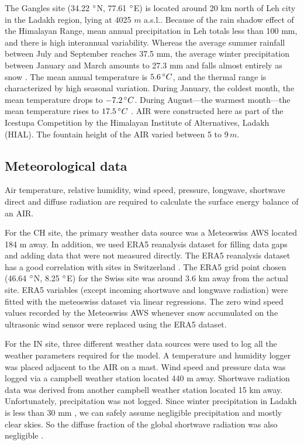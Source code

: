 \documentclass[utf8]{frontiersSCNS} %
\begin{document}
The Gangles site (34.22 $\degree$N, 77.61 $\degree$E) is located around 20 km north of Leh city in the Ladakh region,
lying at 4025 $m$ a.s.l.. Because of the rain shadow effect of the Himalayan Range, mean annual precipitation in Leh
totals less than 100 mm, and there is high interannual variability. Whereas the average summer rainfall between July and
September reaches 37.5 mm, the average winter precipitation between January and March amounts to 27.3 mm and falls
almost entirely as snow . The mean annual temperature is $5.6 \, \degree C$, and the thermal range is characterized by
high seasonal variation. During January, the coldest month, the mean temperature drops to $-7.2 \, \degree C$. During
August—the warmest month—the mean temperature rises to $17.5 \, \degree C$ \citep{Nusser_2012}. AIR were constructed
here as part of the Icestupa Competition  by the Himalayan Institute of Alternatives, Ladakh (HIAL). The fountain height
of the AIR varied between 5 to 9\,$m$. 

\subsection{Meteorological data}

Air temperature, relative humidity, wind speed, pressure, longwave, shortwave direct and diffuse radiation are required
to calculate the surface energy balance of an AIR.

For the CH site, the primary weather data source was a Meteoswiss AWS located 184 m away. In addition, we used ERA5
reanalysis dataset \citep{era5} for filling data gaps and adding data that were not measured directly.  The ERA5
reanalysis dataset has a good correlation with sites in Switzerland \citep{Scherrer_2020}. The ERA5 grid point chosen
(46.64 $\degree$N, 8.25 $\degree$E) for the Swiss site was around 3.6 km away from the actual site.  ERA5 variables
(except incoming shortwave and longwave radiation) were fitted with the meteoswiss dataset via linear regressions. The
zero wind speed values recorded by the Meteoswiss AWS whenever snow accumulated on the ultrasonic wind sensor were
replaced using the ERA5 dataset.

For the IN site, three different weather data sources were used to log all the weather parameters required for the
model. A temperature and humidity logger was placed adjacent to the AIR on a mast. Wind speed and pressure data was
logged via a campbell weather station located 440 m away. Shortwave radiation data was derived from another campbell
weather station located 15 km away. Unfortunately, precipitation was not logged. Since winter precipitation in Ladakh is
less than 30 mm \citep{Nusser_2012}, we can safely assume negligible precipitation and mostly clear skies. So the
diffuse fraction of the global shortwave radiation was also negligible .
\end{document}
